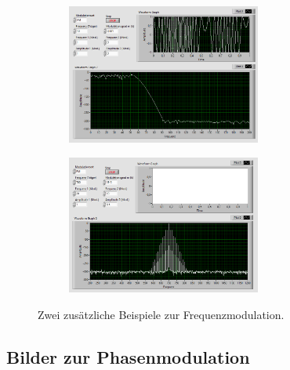 \begin{figure}[H]
	\centering
	\begin{subfigure}[c]{\textwidth}
		\centering
		\includegraphics[width=0.7\textwidth]{pic/fmt10.png}
	\end{subfigure}
	\begin{subfigure}[c]{\textwidth}
		\centering
		\includegraphics[width=0.7\textwidth]{pic/fmt700.png}
	\end{subfigure}	
	\caption{Zwei zusätzliche Beispiele zur Frequenzmodulation.}
	\label{fig:a7}	
\end{figure}


\newpage

\subsection{Bilder zur Phasenmodulation}

